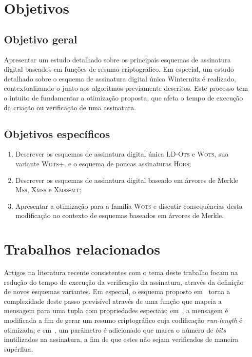 \documentclass{ufsctex/ufsctex}
\newcommand{\lots}{\textsc{LD-Ots}}
\newcommand{\wots}{\textsc{Wots}}
\newcommand{\wotsplus}{\textsc{Wots+}}
\newcommand{\hors}{\textsc{Hors}}
\newcommand{\mss}{\textsc{Mss}}
\newcommand{\xmss}{\textsc{Xmss}}
\newcommand{\xmssmt}{\textsc{Xmss-mt}}
\begin{document}
\section{Objetivos}\label{section:objectives}

\subsection{Objetivo geral}\label{subsection:general}

Apresentar um estudo detalhado sobre os principais esquemas de assinatura
digital baseados em funções de resumo criptográfico. Em especial, um estudo
detalhado sobre o esquema de assinatura digital única Winternitz é realizado,
contextualizando-o junto aos algoritmos previamente descritos. Este processo
tem o intuito de fundamentar a otimização proposta, que afeta o tempo de
execução da criação ou verificação de uma assinatura.

\subsection{Objetivos específicos}\label{subsection:specific}

\begin{enumerate}[label=\roman*.]

  \item Descrever os esquemas de assinatura digital única \lots{} e \wots{},
      sua variante \wotsplus{}, e o esquema de poucas assinaturas \hors{};

  \item Descrever os esquemas de assinatura digital baseado em árvores de
      Merkle \mss{}, \xmss{} e \xmssmt{};

  \item Apresentar a otimização para a família \wots{} e discutir consequências
      desta modificação no contexto de esquemas baseados em árvores de Merkle.

\end{enumerate}

\section{Trabalhos relacionados}\label{section:related}

Artigos na literatura recente consistentes com o tema deste trabalho focam na
redução do tempo de execução da verificação da assinatura, através da definição
de novos esquemas variantes. Em especial, o esquema proposto
em~\cite{Cruz:inproc:2016:oct} torna a complexidade deste passo previsível
através de uma função que mapeia a mensagem para uma tupla com propriedades
especiais; em~\cite{Steinwandt:article:2008:oct}, a mensagem é modificada a fim
de gerar um resumo criptográfico cuja codificação \emph{run-length} é
otimizada; e em~\cite{McGrew:report:2018:apr}, um parâmetro é adicionado que
marca o número de \emph{bits} inutilizados na assinatura, a fim de que estes
não sejam verificados de maneira supérflua.
\end{document}
